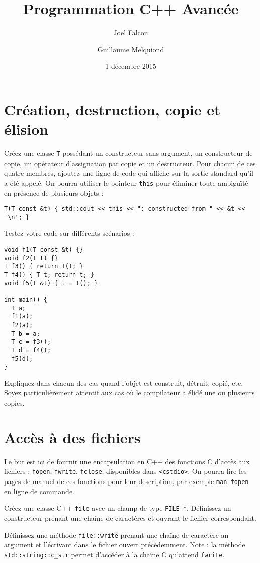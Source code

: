 \documentclass[a4paper]{article}
\title{\vspace{-2cm}Programmation C++ Avancée}
\author{Joel Falcou \and Guillaume Melquiond}
\date{1 décembre 2015}
\begin{document}
\maketitle

\section{Création, destruction, copie et élision}

Créez une classe \lstinline|T| possédant un constructeur sans argument,
un constructeur de copie, un opérateur d'assignation par copie et un
destructeur. Pour chacun de ces quatre membres, ajoutez une ligne de code
qui affiche sur la sortie standard qu'il a été appelé. On pourra utiliser
le pointeur \lstinline|this| pour éliminer toute ambiguïté en présence de
plusieurs objets :
\begin{lstlisting}
T(T const &t) { std::cout << this << ": constructed from " << &t << '\n'; }
\end{lstlisting}

Testez votre code sur différents scénarios :
\begin{lstlisting}
void f1(T const &t) {}
void f2(T t) {}
T f3() { return T(); }
T f4() { T t; return t; }
void f5(T &t) { t = T(); }

int main() {
  T a;
  f1(a);
  f2(a);
  T b = a;
  T c = f3();
  T d = f4();
  f5(d);
}
\end{lstlisting}

Expliquez dans chacun des cas quand l'objet est construit, détruit,
copié, etc. Soyez particulièrement attentif aux cas où le compilateur a
élidé une ou plusieurs copies.

\section{Accès à des fichiers}

Le but est ici de fournir une encapsulation en C++ des fonctions C
d'accès aux fichiers : \lstinline|fopen|, \lstinline|fwrite|,
\lstinline|fclose|, disponibles dans \lstinline|<cstdio>|. On pourra lire
les pages de manuel de ces fonctions pour leur description, par exemple
\lstinline|man fopen| en ligne de commande.

Créez une classe C++ \lstinline|file| avec un champ de type
\lstinline|FILE *|. Définissez un constructeur prenant une chaîne de
caractères et ouvrant le fichier correspondant.

Définissez une méthode \lstinline|file::write| prenant une chaîne de
caractère an argument et l'écrivant dans le fichier ouvert
précédemment. Note : la méthode \lstinline|std::string::c_str| permet
d'accéder à la chaîne C qu'attend \lstinline|fwrite|.
\end{document}
